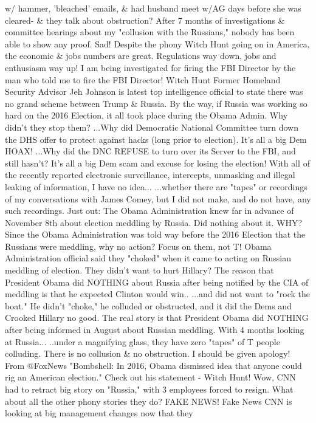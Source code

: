 w/ hammer, 'bleached' emails, \& had husband meet w/AG days before she
was cleared- \& they talk about obstruction? After 7 months of
investigations \& committee hearings about my "collusion with the
Russians," nobody has been able to show any proof. Sad! Despite the
phony Witch Hunt going on in America, the economic \& jobs numbers are
great. Regulations way down, jobs and enthusiasm way up! I am being
investigated for firing the FBI Director by the man who told me to fire
the FBI Director! Witch Hunt Former Homeland Security Advisor Jeh
Johnson is latest top intelligence official to state there was no grand
scheme between Trump \& Russia. By the way, if Russia was working so
hard on the 2016 Election, it all took place during the Obama Admin. Why
didn't they stop them? ...Why did Democratic National Committee turn
down the DHS offer to protect against hacks (long prior to election).
It's all a big Dem HOAX! ...Why did the DNC REFUSE to turn over its
Server to the FBI, and still hasn't? It's all a big Dem scam and excuse
for losing the election! With all of the recently reported electronic
surveillance, intercepts, unmasking and illegal leaking of information,
I have no idea... ...whether there are "tapes" or recordings of my
conversations with James Comey, but I did not make, and do not have, any
such recordings. Just out: The Obama Administration knew far in advance
of November 8th about election meddling by Russia. Did nothing about it.
WHY? Since the Obama Administration was told way before the 2016
Election that the Russians were meddling, why no action? Focus on them,
not T! Obama Administration official said they "choked" when it came to
acting on Russian meddling of election. They didn't want to hurt
Hillary? The reason that President Obama did NOTHING about Russia after
being notified by the CIA of meddling is that he expected Clinton would
win.. ...and did not want to "rock the boat." He didn't "choke," he
colluded or obstructed, and it did the Dems and Crooked Hillary no good.
The real story is that President Obama did NOTHING after being informed
in August about Russian meddling. With 4 months looking at Russia...
..under a magnifying glass, they have zero "tapes" of T people
colluding. There is no collusion \& no obstruction. I should be given
apology! From @FoxNews "Bombshell: In 2016, Obama dismissed idea that
anyone could rig an American election." Check out his statement - Witch
Hunt! Wow, CNN had to retract big story on "Russia," with 3 employees
forced to resign. What about all the other phony stories they do? FAKE
NEWS! Fake News CNN is looking at big management changes now that they
